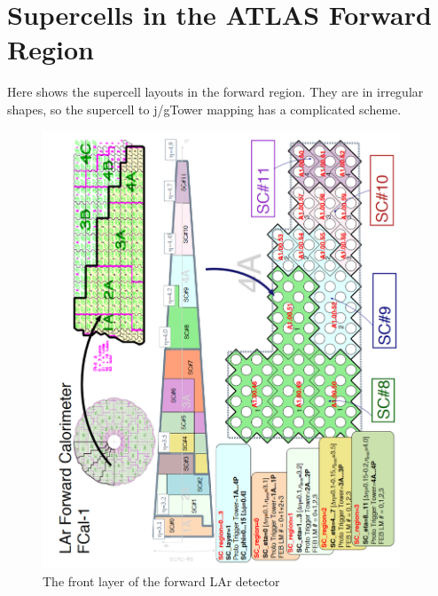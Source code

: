 \chapter{Supercells in the ATLAS Forward Region}
Here shows the supercell layouts in the forward region. They are in irregular shapes, so the supercell to j/gTower mapping has a complicated scheme. 
\begin{figure}[ht]
	\centering
    \includegraphics[width=0.95\textwidth]{Chapter6/FCAL1.png}
	\caption{The front layer of the forward LAr detector}
\end{figure}
